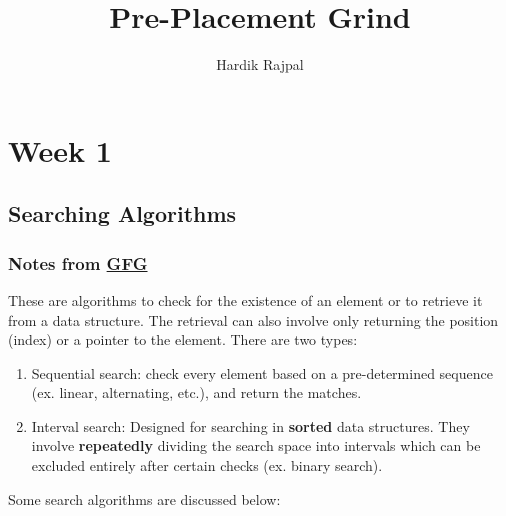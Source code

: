 \documentclass{article}
\author{Hardik Rajpal}
\begin{document}
\title{Pre-Placement Grind}
\maketitle
\tableofcontents
\pagebreak
\section{Week 1}
\subsection{Searching Algorithms}
\subsubsection*{Notes from \href{https://www.geeksforgeeks.org/searching-algorithms/}{GFG}}
These are algorithms to check for the existence of an element or to retrieve it from
a data structure. The retrieval can also involve only returning the position (index)
or a pointer to the element. There are two types:
\begin{enumerate}
    \item Sequential search: check every element based on a pre-determined sequence (ex. linear, alternating, etc.),
    and return the matches.
    \item Interval search: Designed for searching in \textbf{sorted} data structures.
    They involve \textbf{repeatedly} dividing the search space into intervals which
    can be excluded entirely after certain checks (ex. binary search).
\end{enumerate}
Some search algorithms are discussed below:
\end{document}
